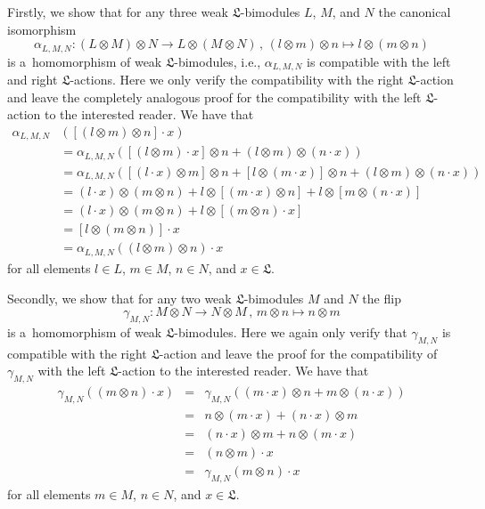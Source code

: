 \documentclass{jonasart}
\newcommand{\lf}{\mathfrak{L}}
\begin{document}
	Firstly, we show that for any three weak $\lf$-bimodules $L$, $M$, and $N$ the canonical isomorphism
	\[
		\alpha_{L,M,N}:(L\otimes M)\otimes N\to L\otimes(M\otimes N)\,,\,
		(l\otimes m)\otimes n\mapsto l\otimes(m\otimes n)
	\]
	is a~homomorphism of weak $\lf$-bimodules, i.e., $\alpha_{L,M,N}$
	is compatible with the left and right $\lf$-actions. Here we only verify the compatibility with the right $\lf$-action and leave the completely analogous proof for the compatibility with the left $\lf$-action to the interested reader. We have that
	\begin{align*}
		\alpha_{L,M,N}{ }&{ }([(l\otimes m)\otimes n]\cdot x) \\
        & = \alpha_{L,M,N}
		([(l\otimes m)\cdot x]\otimes n+(l\otimes m)\otimes(n\cdot x))\\
		& = \alpha_{L,M,N}([(l\cdot x)\otimes m]\otimes n+[l\otimes(m\cdot x)]
		\otimes n+(l\otimes m)\otimes(n\cdot x))\\
		& = (l\cdot x)\otimes(m\otimes n)+l\otimes[(m\cdot x)\otimes n]
		+l\otimes[m\otimes(n\cdot x)]\\
		& = (l\cdot x)\otimes(m\otimes n)+l\otimes[(m\otimes n)\cdot x]\\
		& = [l\otimes(m\otimes n)]\cdot x\\
		& = \alpha_{L,M,N}((l\otimes m)\otimes n)\cdot x
	\end{align*}
	for all elements $l\in L$, $m\in M$, $n\in N$, and $x\in\lf$.

	Secondly, we show that for any two weak $\lf$-bimodules $M$
	and $N$ the flip
	\[
		\gamma_{M,N}:M\otimes N\to N\otimes M\,,\, m\otimes n\mapsto n\otimes m
	\]
	is a~homomorphism of weak $\lf$-bimodules. Here we again only verify that $\gamma_{M,N}$ is compatible with the right $\lf$-action and leave the proof for the compatibility of $\gamma_{M,N}$ with the left $\lf$-action to the interested reader. We have that
	\begin{eqnarray*}
		\gamma_{M,N}((m\otimes n)\cdot x) & = & \gamma_{M,N}((m\cdot x)
		\otimes n+m\otimes(n\cdot x))\\
		& = & n\otimes(m\cdot x)+(n\cdot x)\otimes m\\
		& = & (n\cdot x)\otimes m+n\otimes(m\cdot x)\\
		& = & (n\otimes m)\cdot x\\
		& = & \gamma_{M,N}(m\otimes n)\cdot x
	\end{eqnarray*}
	for all elements $m\in M$, $n\in N$, and $x\in\lf$.
\end{document}
